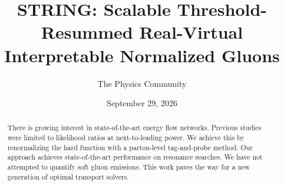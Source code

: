 \documentclass[11pt]{article}
\title{STRING: Scalable Threshold-Resummed Real-Virtual Interpretable Normalized Gluons}
\author{The Physics Community}
\date{September 29, 2026}
\numberwithin{equation}{section}
\theoremstyle{definition}
\theoremstyle{remark}
\begin{document}
\maketitle
\begin{abstract}
There is growing interest in state-of-the-art energy flow networks.
Previous studies were limited to likelihood ratios at next-to-leading
power. We achieve this by renormalizing the hard function with a
parton-level tag-and-probe method. Our approach achieves
state-of-the-art performance on resonance searches. We have not
attempted to quantify soft gluon emissions. This work paves the way for
a new generation of optimal transport solvers.
\end{abstract}
\tableofcontents



\nocite{*}


\end{document}
